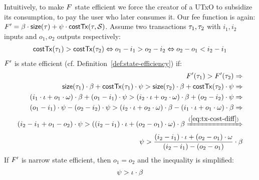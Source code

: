 Intuitively, to make $F$ state efficient we force the creator of
a UTxO to subsidize its consumption, \ie to pay the user who later
consumes it. Our fee function is again: $F' =
\beta \cdot \mathsf{size}(\tau) + \psi \cdot \mathsf{costTx}(\tau,
\mathcal{S})$. Assume two transactions $\tau_1, \tau_2$ with $i_1, i_2$
inputs and $o_1, o_2$ outputs respectively:
\begin{align}
    \mathsf{costTx}(\tau_1) > \mathsf{costTx}(\tau_2) \Leftrightarrow
    o_1 - i_1 > o_2 - i_2 \Leftrightarrow
    o_2 - o_1 < i_2 - i_1 \label{eq:tx-cost-diff}
\end{align}
$F'$ is state efficient (cf.
Definition~\ref{def:state-efficiency}) if:
\begin{align}
    F'(\tau_1) > F'(\tau_2) \Rightarrow \nonumber \\
    \mathsf{size}(\tau_1) \cdot \beta + \mathsf{costTx}(\tau_1) \cdot \psi > \mathsf{size}(\tau_2) \cdot \beta + \mathsf{costTx}(\tau_2) \cdot \psi \Rightarrow \nonumber \\
    (i_1 \cdot \iota + o_1 \cdot \omega) \cdot \beta + (o_1 - i_1) \cdot \psi > (i_2 \cdot \iota + o_2 \cdot \omega) \cdot \beta + (o_2 - i_2) \cdot \psi \Rightarrow \nonumber \\
     (o_1 - i_1) \cdot \psi - (o_2 - i_2) \cdot \psi > (i_2 \cdot \iota + o_2 \cdot \omega) \cdot \beta - (i_1 \cdot \iota + o_1 \cdot \omega) \cdot \beta \Rightarrow \nonumber \\
     (i_2 - i_1 + o_1 - o_2) \cdot \psi > ((i_2 - i_1) \cdot \iota + (o_2 - o_1) \cdot \omega) \cdot \beta \xRightarrow{(\ref{eq:tx-cost-diff})} \nonumber \\
    \psi > \frac{(i_2 - i_1) \cdot \iota + (o_2 - o_1) \cdot \omega}{(i_2 - i_1) - (o_2 - o_1)} \cdot \beta \label{eq:state-efficiency}
\end{align}
If $F'$ is narrow state efficient, then $o_1 = o_2$ and the inequality is simplified:
\begin{align}
    \psi > \iota \cdot \beta \label{eq:narrow-state-efficiency}
\end{align}

